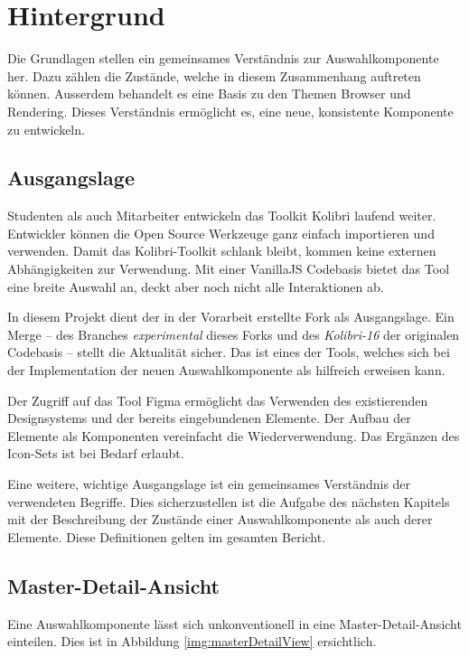 \chapter{Hintergrund}
\label{chap:background}

Die Grundlagen stellen ein gemeinsames Verständnis zur Auswahlkomponente her. 
Dazu zählen die Zustände, welche in diesem Zusammenhang auftreten können. 
Ausserdem behandelt es eine Basis zu den Themen Browser und Rendering. 
Dieses Verständnis ermöglicht es, eine neue, konsistente Komponente zu entwickeln.


\section{Ausgangslage}
\label{sec:basics}

Studenten als auch Mitarbeiter entwickeln das Toolkit Kolibri laufend weiter. 
Entwickler können die Open Source Werkzeuge ganz einfach importieren und verwenden. 
Damit das Kolibri-Toolkit schlank bleibt, kommen keine externen Abhängigkeiten zur Verwendung. 
Mit einer VanillaJS Codebasis bietet das Tool eine breite Auswahl an, deckt aber noch nicht alle Interaktionen ab. 

In diesem Projekt dient der in der Vorarbeit erstellte Fork als Ausgangslage. 
Ein Merge – des Branches \emph{experimental} dieses Forks und des \emph{Kolibri-16} der originalen Codebasis – stellt die Aktualität sicher. 
Das  ist eines der Tools, welches sich bei der Implementation der neuen Auswahlkomponente als hilfreich erweisen kann. 

Der Zugriff auf das Tool Figma ermöglicht das Verwenden des existierenden Designsystems und der bereits eingebundenen Elemente. 
Der Aufbau der Elemente als Komponenten vereinfacht die Wiederverwendung. 
Das Ergänzen des Icon-Sets ist bei Bedarf erlaubt. 

Eine weitere, wichtige Ausgangslage ist ein gemeinsames Verständnis der verwendeten Begriffe. 
Dies sicherzustellen ist die Aufgabe des nächsten Kapitels mit der Beschreibung der Zustände einer Auswahlkomponente als auch derer Elemente. 
Diese Definitionen gelten im gesamten Bericht. 


\section{Master-Detail-Ansicht}
\label{sec:masterDetailView}

Eine Auswahlkomponente lässt sich unkonventionell in eine Master-Detail-Ansicht einteilen. 
Dies ist in Abbildung \ref{img:masterDetailView} ersichtlich. 

